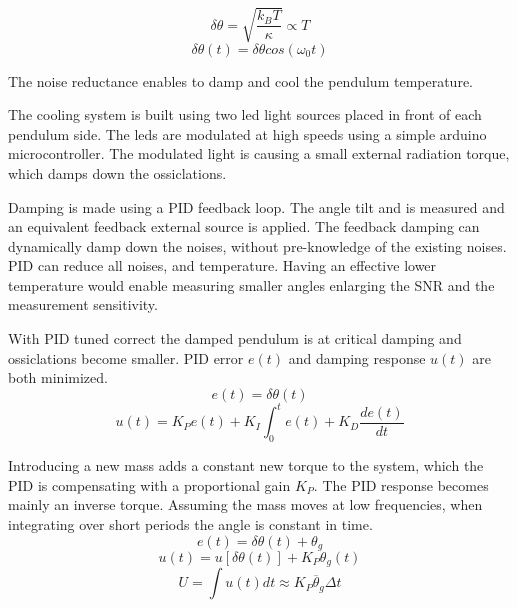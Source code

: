 \documentclass[\main/master.tex]{subfiles}
\begin{document}
\begin{equation}
\delta\theta = \sqrt{\frac{k_BT}{\kappa}}\propto{T}  \label{eqn:radiation force}
\end{equation}
\begin{equation}
\delta\theta(t) = \delta\theta cos(\omega_0 t)   \label{eqn:pid_error}
\end{equation}
\par\noindent
The noise reductance enables to damp and cool the pendulum temperature. 
\par\noindent
The cooling system is built using two led light sources placed in front of each pendulum side. The leds are modulated at high speeds using a simple arduino microcontroller. The modulated light is causing a small external radiation torque, which damps down the ossiclations.
\par\noindent
Damping is made using a PID feedback loop. The angle tilt and is measured and an equivalent feedback external source is applied. The feedback damping can dynamically damp down the noises, without pre-knowledge of the existing noises. PID can reduce all noises, and temperature. Having an effective lower temperature would enable measuring smaller angles enlarging the SNR and the measurement sensitivity.


\par\noindent
With PID tuned correct the damped pendulum is at critical damping and ossiclations become smaller. PID error $e(t)$ and damping response $u(t)$ are both minimized. 
\begin{equation}
e(t) = \delta\theta(t)   \label{eqn:pid_error}
\end{equation}
\begin{equation}
u(t) = K_Pe(t)+K_I\int_{0}^{t}e(t)+K_D\frac{de(t)}{dt}   \label{eqn:PID_eq}
\end{equation}

\noindent
Introducing a new mass adds a constant new torque to the system, which the PID is compensating with a proportional gain $K_P$. The PID response becomes mainly an inverse torque. Assuming the mass moves at low frequencies, when integrating over short periods the angle is constant in time.
\begin{equation}
e(t) = \delta\theta(t) + \theta_g    \label{eqn:PID_measurement}
\end{equation}
\begin{equation}
u(t) = u[ \delta\theta(t)] + K_P\theta_g(t) \label{eqn:PID_measurement_eqn}
\end{equation}
\begin{equation}
U = \int u(t)dt  \approx K_P\overline{\theta}_g\Delta t \label{eqn:PID_measurement_eqn}
\end{equation}
\end{document}
